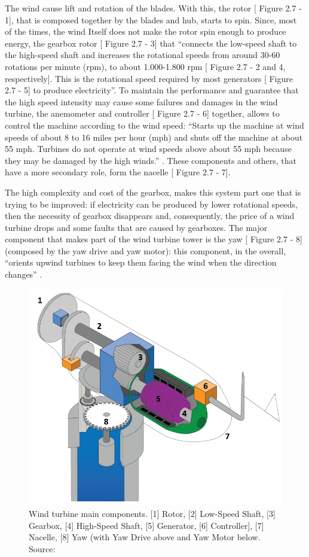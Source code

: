 The wind cause lift and rotation of the blades. With this, the rotor [ Figure 2.7 - 1], that is composed together by the blades and hub, starts to spin. Since, most of the times, the wind Itself does not make the rotor spin enough to produce energy, the gearbox rotor [ Figure 2.7 - 3] that “connects the low-speed shaft to the high-speed shaft and increases the rotational speeds from around 30-60 rotations per minute (rpm), to about 1.000-1.800 rpm [ Figure 2.7 - 2 and 4, respectively]. This is the rotational speed required by most generators [ Figure 2.7 - 5] to produce electricity”. To maintain the performance and guarantee that the high speed intensity may cause some failures and damages in the wind turbine, the anemometer and controller [ Figure 2.7 - 6] together, allows to control the machine according to the wind speed: “Starts up the machine at wind speeds of about 8 to 16 miles per hour (mph) and shuts off the machine at about 55 mph. Turbines do not operate at wind speeds above about 55 mph because they may be damaged by the high winds.” \cite{OLD_29_WIND}. These components and others, that have a more secondary role, form the nacelle [ Figure 2.7 - 7].

The high complexity and cost of the gearbox, makes this system part one that is trying to be improved: if electricity can be produced by lower rotational speeds, then the necessity of gearbox disappears and, consequently, the price of a wind turbine drops and some faults that are caused by gearboxes.
The major component that makes part of the wind turbine tower is the yaw [ Figure 2.7 - 8] (composed by the yaw drive and yaw motor): this component, in the overall, “orients upwind turbines to keep them facing the wind when the direction changes” \cite{OLD_29_WIND}.


\begin{figure}[htbp]
	\centering
	\includegraphics[scale=0.5]{Chapters/Figures/background_fig8.PNG}
	\caption{Wind turbine main components. [1] Rotor, [2] Low-Speed Shaft, [3] Gearbox, [4] High-Speed Shaft, [5] Generator, [6] Controller], [7] Nacelle, [8] Yaw (with Yaw Drive above and Yaw Motor below. Source: \cite{OLD_29_WIND} }
	\label{fig:Figuras_Tree_silhouettes-vectorial}
\end{figure}


